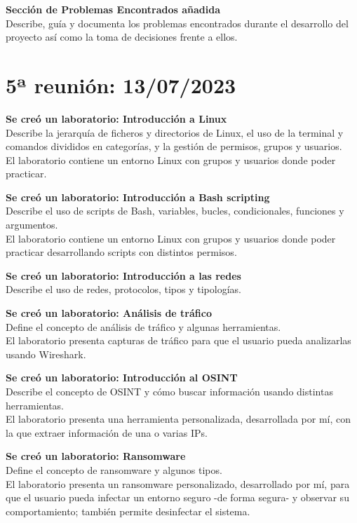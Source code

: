         \textbf{Sección de Problemas Encontrados añadida} \\
        Describe, guía y documenta los problemas encontrados durante el desarrollo del proyecto así como la toma de decisiones frente a ellos.


    \section{5ª reunión: 13/07/2023}

        \textbf{Se creó un laboratorio: Introducción a Linux} \\
        Describe la jerarquía de ficheros y directorios de Linux, el uso de la terminal y comandos divididos en categorías, y la gestión de permisos, grupos y usuarios. \\
        El laboratorio contiene un entorno Linux con grupos y usuarios donde poder practicar.

        \textbf{Se creó un laboratorio: Introducción a Bash scripting} \\
        Describe el uso de scripts de Bash, variables, bucles, condicionales, funciones y argumentos. \\
        El laboratorio contiene un entorno Linux con grupos y usuarios donde poder practicar desarrollando scripts con distintos permisos.

        \textbf{Se creó un laboratorio: Introducción a las redes} \\
        Describe el uso de redes, protocolos, tipos y tipologías.

        \textbf{Se creó un laboratorio: Análisis de tráfico} \\
        Define el concepto de análisis de tráfico y algunas herramientas. \\
        El laboratorio presenta capturas de tráfico para que el usuario pueda analizarlas usando Wireshark.

        \textbf{Se creó un laboratorio: Introducción al OSINT} \\
        Describe el concepto de OSINT y cómo buscar información usando distintas herramientas. \\
        El laboratorio presenta una herramienta personalizada, desarrollada por mí, con la que extraer información de una o varias IPs.

        \textbf{Se creó un laboratorio: Ransomware} \\
        Define el concepto de ransomware y algunos tipos. \\
        El laboratorio presenta un ransomware personalizado, desarrollado por mí, para que el usuario pueda infectar un entorno seguro -de forma segura- y observar su comportamiento; también permite desinfectar el sistema.

